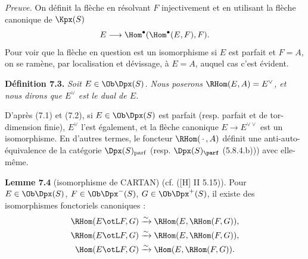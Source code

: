 \emph{Preuve.} On définit la flèche en résolvant \(F\) injectivement et en utilisant la flèche canonique de \(\Kpx(S)\)
\[
  E\longrightarrow\Hom^\bullet(\Hom^\bullet(E,F),F).
\]
Pour voir que la flèche en question est un isomorphisme si \(E\) est parfait et \(F=A\), on se ramène, par localisation et dévissage, à \(E=A\), auquel cas c'est évident.

\textbf{Définition 7.3.} \emph{Soit \(E\in\Ob\Dpx(S)\). Nous poserons \(\RHom(E,A)=E^\vee\), et nous dirons que \(E^\vee\) est le dual de \(E\).}

D'après (7.1) et (7.2), si \(E\in\Ob\Dpx(S)\) est parfait (resp. parfait et de tor-dimension finie), \(E^\vee\) l'est également, et la flèche canonique \(E\to E^{\vee\vee}\) est un isomorphisme. En d'autres termes, le foncteur \(\RHom(\,\cdot\,,A)\) définit une anti-auto-équivalence de la catégorie \(\Dpx(S)_{\mathrm{parf}}\) (resp. \(\Dpx(S)_{\parf}\) (5.8.4.b))) avec elle-même.

\textbf{Lemme 7.4} (isomorphisme de CARTAN) (cf. ([H] II 5.15)). Pour \(E\in\Ob\Dpx(S)\), \(F\in\Ob\Dpx^-(S)\), \(G\in\Ob\Dpx^+(S)\), il existe des isomorphismes fonctoriels canoniques :
\[
\begin{aligned}
\RHom(E\otL F,G)&\xrightarrow{\sim}\RHom(E,\RHom(F,G)),\\
\RHom(E\otL F,G)&\xrightarrow{\sim}\RHom(E,\RHom(F,G)),\\
\Hom(E\otL F,G)&\xrightarrow{\sim}\Hom(E,\RHom(F,G)).
\end{aligned}
\]

